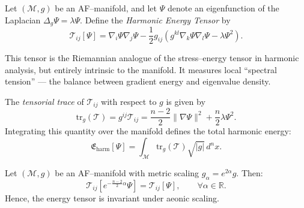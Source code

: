 \begin{definition}
\label{def:harmonic-energy-tensor}
Let \((\mathcal{M},g)\) be an AF–manifold,
and let \(\Psi\) denote an eigenfunction of the Laplacian
\(\Delta_g \Psi = \lambda \Psi\).
Define the \emph{Harmonic Energy Tensor} by
\begin{equation}
\label{eq:energy-tensor}
\mathcal{T}_{ij}[\Psi]
=
\nabla_i \Psi \nabla_j \Psi
- \frac{1}{2} g_{ij}\!\left(
g^{kl}\nabla_k \Psi \nabla_l \Psi
- \lambda \Psi^2
\right).
\end{equation}
\end{definition}

\begin{remark}
This tensor is the Riemannian analogue of the stress–energy tensor
in harmonic analysis, but entirely intrinsic to the manifold.
It measures local “spectral tension” — the balance between
gradient energy and eigenvalue density.
\end{remark}


\begin{definition}
\label{def:tensor-trace}
The \emph{tensorial trace} of \(\mathcal{T}_{ij}\) with respect to \(g\)
is given by
\begin{equation}
\mathrm{tr}_g(\mathcal{T})
=
g^{ij}\mathcal{T}_{ij}
=
\frac{n-2}{2}\|\nabla\Psi\|^2 + \frac{n}{2}\lambda \Psi^2.
\end{equation}
Integrating this quantity over the manifold defines
the total harmonic energy:
\begin{equation}
\label{eq:total-energy}
\mathfrak{E}_{\mathrm{harm}}[\Psi]
=
\int_{\mathcal{M}}
\mathrm{tr}_g(\mathcal{T}) \sqrt{|g|}\,d^nx.
\end{equation}
\end{definition}

\begin{theorem}
\label{thm:energy-tensor-invariance}
Let \((\mathcal{M},g)\) be an AF–manifold with metric scaling
\(g_\alpha = e^{2\alpha}g\).
Then:
\[
\mathcal{T}_{ij}[e^{-\frac{n-2}{2}\alpha}\Psi]
=
\mathcal{T}_{ij}[\Psi],
\qquad
\forall \alpha \in \mathbb{R}.
\]
Hence, the energy tensor is invariant under aeonic scaling.
\end{theorem}

